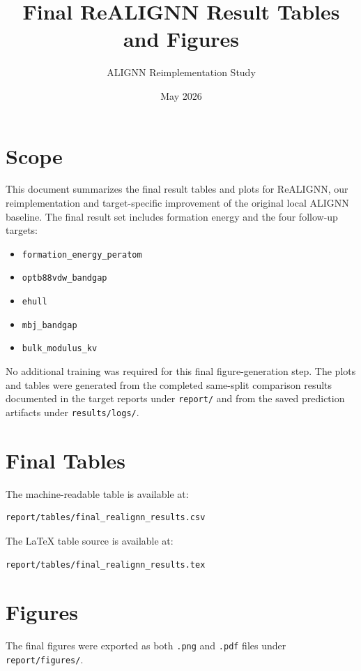 \documentclass[11pt]{article}
\title{Final ReALIGNN Result Tables and Figures}
\author{ALIGNN Reimplementation Study}
\date{May 2026}
\begin{document}
\maketitle

\section{Scope}

This document summarizes the final result tables and plots for ReALIGNN, our reimplementation and target-specific improvement of the original local ALIGNN baseline.  The final result set includes formation energy and the four follow-up targets:
\begin{itemize}
  \item \texttt{formation\_energy\_peratom}
  \item \texttt{optb88vdw\_bandgap}
  \item \texttt{ehull}
  \item \texttt{mbj\_bandgap}
  \item \texttt{bulk\_modulus\_kv}
\end{itemize}

No additional training was required for this final figure-generation step.  The plots and tables were generated from the completed same-split comparison results documented in the target reports under \texttt{report/} and from the saved prediction artifacts under \texttt{results/logs/}.

\section{Final Tables}

The machine-readable table is available at:
\begin{verbatim}
report/tables/final_realignn_results.csv
\end{verbatim}

The LaTeX table source is available at:
\begin{verbatim}
report/tables/final_realignn_results.tex
\end{verbatim}



\section{Figures}

The final figures were exported as both \texttt{.png} and \texttt{.pdf} files under \texttt{report/figures/}.
\end{document}
